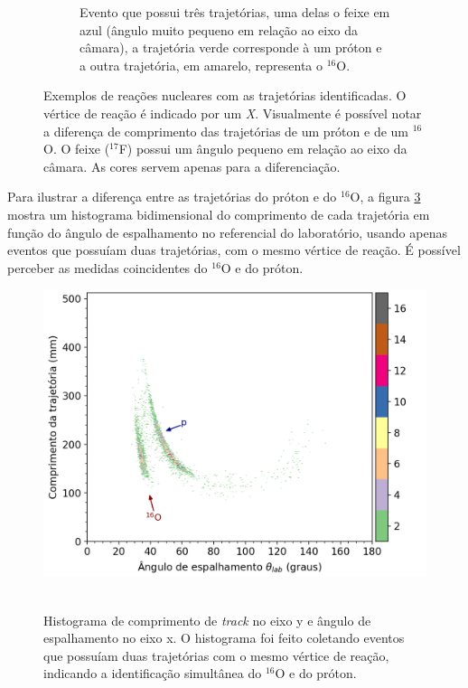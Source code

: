 \documentclass[a4paper,12pt,oneside]{book}
\begin{document}
\begin{figure}[H]
\begin{subfigure}[t]{0.45\textwidth}
        \caption{Evento que possui três trajetórias, uma delas o feixe em azul (ângulo muito pequeno em relação ao eixo da câmara), a trajetória verde corresponde à um próton e a outra trajetória, em amarelo, representa o $^{16}$O.}
        \label{subfig:exemplo_track_beam_proton_16O}
    \end{subfigure}
\caption{Exemplos de reações nucleares com as trajetórias identificadas. O vértice de reação é indicado por um \textit{X}. Visualmente é possível notar a diferença de comprimento das trajetórias de um próton e de um $^{16}$O. O feixe ($^{17}$F) possui um ângulo pequeno em relação ao eixo da câmara. As cores servem apenas para a diferenciação.}
\label{fig:exemplos_tracks_diff}
\end{figure}



\par Para ilustrar a diferença entre as trajetórias do próton e do $^{16}$O, a figura \ref{fig:coincidencia_detec} mostra um histograma bidimensional do comprimento de cada trajetória em função do ângulo de espalhamento no referencial do laboratório, usando apenas eventos que possuíam duas trajetórias, com o mesmo vértice de reação. É possível perceber as medidas coincidentes do $^{16}$O e do próton.

\begin{figure}[H]
    \centering
    \includegraphics[scale = 0.75]{figs/coincidencias_tpc.png}\
    \caption{Histograma de comprimento de \textit{track} no eixo y e ângulo de espalhamento no eixo x. O histograma foi feito coletando eventos que possuíam duas trajetórias com o mesmo vértice de reação, indicando a identificação simultânea do $^{16}$O e do próton.}
    \label{fig:coincidencia_detec}
\end{figure}
\end{document}
